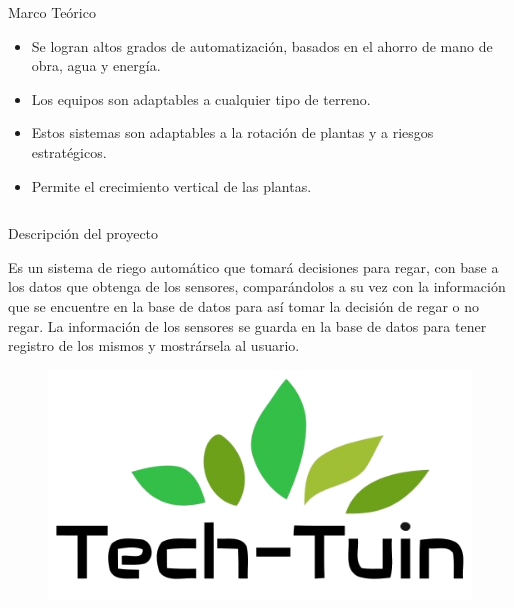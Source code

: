 \documentclass{beamer}
\begin{document}
\begin{frame}[fragile]{}
\begin{columns}[t]
\begin{column}{0.96\textwidth}
\begin{block}{Marco Teórico}
\begin{itemize}

\item Se logran altos grados de automatización, basados en el ahorro de mano de obra, agua y energía.
\item Los equipos son adaptables a cualquier tipo de terreno.
\item Estos sistemas son adaptables a la rotación de plantas y a riesgos estratégicos.
\item Permite el crecimiento vertical de las plantas.

\end{itemize}
    \end{block}
  \end{column}
\end{columns}


\justifying
\begin{columns}[t]
	
	
	  \begin{column}{0.46\textwidth}
	  	\begin{block}{Descripción del proyecto}
	  		\begin{minipage}[t]{1\linewidth}
	  			\vspace{0pt} 
	  			Es un sistema de riego automático que tomará decisiones para regar, con base a los datos que obtenga de los sensores, comparándolos a su vez con la información que se encuentre en la base de datos para así tomar la decisión de regar o no regar. La información de los sensores se guarda en la base de datos para tener registro de los mismos y mostrársela al usuario.
	  			\begin{figure}[H]
	  				\centering
	  				\includegraphics[scale=0.5]{../graphics/logop}
	  			\end{figure}


\end{minipage}
\end{block}
\end{column}
\end{columns}
\end{frame}
\end{document}

